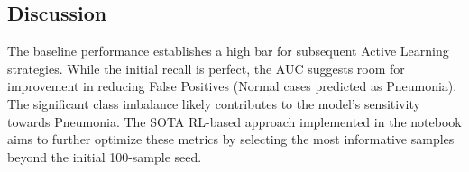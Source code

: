 \documentclass[a4paper,12pt]{article}
\begin{document}
\subsection{Discussion}
The baseline performance establishes a high bar for subsequent Active Learning strategies. While the initial recall is perfect, the AUC suggests room for improvement in reducing False Positives (Normal cases predicted as Pneumonia). The significant class imbalance likely contributes to the model's sensitivity towards Pneumonia. The SOTA RL-based approach implemented in the notebook aims to further optimize these metrics by selecting the most informative samples beyond the initial 100-sample seed.
\end{document}
